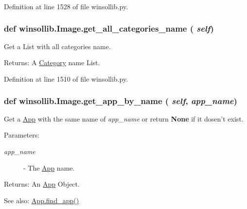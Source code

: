 Definition at line 1528 of file winsollib.py.\hypertarget{classwinsollib_1_1Image_293056786159491affe2334261daf6ea}{
\subsubsection[get\_\-all\_\-categories\_\-name]{\setlength{\rightskip}{0pt plus 5cm}def winsollib.Image.get\_\-all\_\-categories\_\-name ( {\em self})}}
\label{classwinsollib_1_1Image_293056786159491affe2334261daf6ea}


Get a List with all categories name. 

\begin{Desc}
\item[Returns:]A \hyperlink{classwinsollib_1_1Category}{Category} name List. \end{Desc}


Definition at line 1510 of file winsollib.py.\hypertarget{classwinsollib_1_1Image_6145721e18889e1c360e1a8578adb3b0}{
\subsubsection[get\_\-app\_\-by\_\-name]{\setlength{\rightskip}{0pt plus 5cm}def winsollib.Image.get\_\-app\_\-by\_\-name ( {\em self},  {\em app\_\-name})}}
\label{classwinsollib_1_1Image_6145721e18889e1c360e1a8578adb3b0}


Get a \hyperlink{classwinsollib_1_1App}{App} with the same name of {\em app\_\-name\/} or return {\bf None} if it dosen't exist. 

\begin{Desc}
\item[Parameters:]
\begin{description}
\item[{\em app\_\-name}]- The \hyperlink{classwinsollib_1_1App}{App} name. \end{description}
\end{Desc}
\begin{Desc}
\item[Returns:]An \hyperlink{classwinsollib_1_1App}{App} Object.\end{Desc}
\begin{Desc}
\item[See also:]\hyperlink{classwinsollib_1_1App_8781b002b53dc32d0d780fa72069def8}{App.find\_\-app()} \end{Desc}



